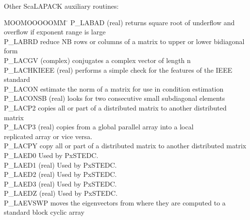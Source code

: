 \documentclass[11pt]{report}
\begin{document}
\noindent
Other ScaLAPACK auxiliary routines:
\begin{tabbing}
MOOMOOOOOMM \= \kill
P\_LABAD \> (real) returns square root of underflow and overflow if exponent range is large \\
P\_LABRD \> reduce NB rows or columns of a matrix to upper or lower bidiagonal form \\
P\_LACGV  \> (complex) conjugates a complex vector of length n \\
P\_LACHKIEEE \> (real) performs a simple check for the features of the IEEE standard \\
P\_LACON  \> estimate the norm of a matrix for use in condition estimation\\
P\_LACONSB \> (real) looks for two consecutive small subdiagonal elements \\
P\_LACP2 \> copies all or part of a distributed matrix to another distributed matrix \\
P\_LACP3 \> (real) copies from a global parallel array into a local \\
         \>  replicated array or vice versa. \\
P\_LACPY \> copy all or part of a distributed matrix to another distributed matrix\\
P\_LAED0 \> Used by PxSTEDC.  \\
P\_LAED1 \> (real) Used by PxSTEDC. \\
P\_LAED2 \> (real) Used by PxSTEDC. \\
P\_LAED3 \> (real) Used by PxSTEDC. \\
P\_LAEDZ \> (real) Used by PxSTEDC. \\
P\_LAEVSWP \> moves the eigenvectors from where they are computed to a \\
          \> standard block cyclic array\\

\end{tabbing}
\end{document}
